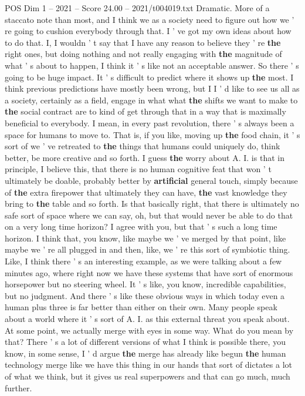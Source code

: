 \begin{textsample}{POS Dim 1 – 2021 – Score 24.00 – 2021/t004019.txt}
Dramatic.
More of a staccato note than most, and I think we as a society need to figure out how we ' re going to cushion everybody through that.
I ' ve got my own ideas about how to do that.
I, I wouldn ' t say that I have any reason to believe they ' re \textbf{the} right ones, but doing nothing and not really engaging with \textbf{the} magnitude of what ' s about to happen, I think it ' s like not an acceptable answer.
So there ' s going to be huge impact.
It ' s difficult to predict where it shows up \textbf{the} most.
I think previous predictions have mostly been wrong, but I I ' d like to see us all as a society, certainly as a field, engage in what what \textbf{the} shifts we want to make to \textbf{the} social contract are to kind of get through that in a way that is maximally beneficial to everybody.
I mean, in every past revolution, there ' s always been a space for humans to move to.
That is, if you like, moving up \textbf{the} food chain, it ' s sort of we ' ve retreated to \textbf{the} things that humans could uniquely do, think better, be more creative and so forth.
I guess \textbf{the} worry about A.
I. is that in principle, I believe this, that there is no human cognitive feat that won ' t ultimately be doable, probably better by \textbf{artificial} general touch, simply because of \textbf{the} extra firepower that ultimately they can have, \textbf{the} vast knowledge they bring to \textbf{the} table and so forth.
Is that basically right, that there is ultimately no safe sort of space where we can say, oh, but that would never be able to do that on a very long time horizon?
I agree with you, but that ' s such a long time horizon.
I think that, you know, like maybe we ' ve merged by that point, like maybe we ' re all plugged in and then, like, we ' re this sort of symbiotic thing.
Like, I think there ' s an interesting example, as we were talking about a few minutes ago, where right now we have these systems that have sort of enormous horsepower but no steering wheel.
It ' s like, you know, incredible capabilities, but no judgment.
And there ' s like these obvious ways in which today even a human plus three is far better than either on their own.
Many people speak about a world where it ' s sort of A.
I. as this external threat you speak about.
At some point, we actually merge with eyes in some way.
What do you mean by that?
There ' s a lot of different versions of what I think is possible there, you know, in some sense, I ' d argue \textbf{the} merge has already like begun \textbf{the} human technology merge like we have this thing in our hands that sort of dictates a lot of what we think, but it gives us real superpowers and that can go much, much further.

\end{textsample}
